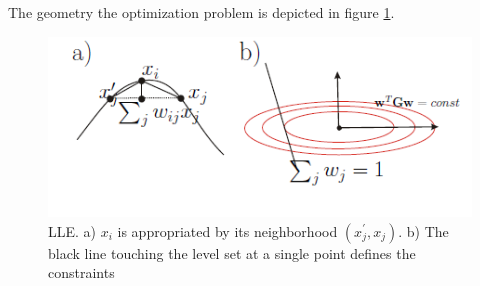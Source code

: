 The geometry the optimization problem is depicted in figure \ref{lle}.

\begin{figure}[ht]
\begin{center}
\includegraphics[width=\textwidth]{./Figures/lle.png}
\caption {LLE. a) $x_i$ is appropriated by its neighborhood $(x_{j}^{'}, x_{j})$. b) The black line touching the level set at a single point defines the constraints}
\label{lle} 
\end{center}
\end{figure}

